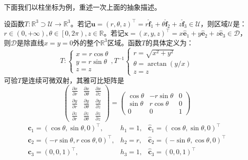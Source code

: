 \documentclass[main.tex]{subfiles}
\begin{document}
下面我们以柱坐标为例，重述一次上面的抽象描述。

\begin{example}[柱坐标]
设函数$T:\mathbb{R}^3\supset\mathcal{U}\rightarrow\mathbb{R}^3$。若记$\mathbf{u}=\left(r,\theta,z\right)^\intercal=r\mathbf{\hat{f}}_1+\theta\mathbf{\hat{f}}_2+z\mathbf{\hat{f}}_3\in\mathcal{U}$，则区域$\mathcal{U}$是：$r\in\left(0,+\infty\right),\theta\in\left[0,2\pi\right),z\in\mathbb{R}$。若记$\mathbf{x}=\left(x,y,z\right)^\intercal=x\mathbf{\hat{e}}_1+y\mathbf{\hat{e}}_2+z\mathbf{\hat{e}}_3\in\mathcal{D}$，则$\mathcal{D}$是除直线$x=y=0$外的整个$\mathbb{R}^3$区域。函数$T$的具体定义为：
\begin{equation*}
T:\left\{\begin{array}{l}
x=r\cos \theta\\
y=r\sin \theta\\
z=z\end{array}\right.,T^{-1}
\left\{\begin{array}{l}
r=\sqrt{x^2+y^2}\\
\theta=\arctan\left(y/x\right)\\
z=z\end{array}\right.
\end{equation*}
可验$T$是连续可微双射，其雅可比矩阵是
\[
\left(\begin{array}{ccc}
\frac{\partial x}{\partial r}&\frac{\partial x}{\partial \theta}&\frac{\partial x}{\partial z}\\
\frac{\partial y}{\partial r}&\frac{\partial y}{\partial \theta}&\frac{\partial y}{\partial z}\\
\frac{\partial z}{\partial r}&\frac{\partial z}{\partial\theta}&\frac{\partial z}{\partial z}
\end{array}\right)=\left(\begin{array}{ccc}
\cos\theta&-r\sin\theta&0\\
\sin\theta&r\cos\theta&0\\
0&0&1\end{array}\right)
\]
\begin{equation*}
\begin{array}{lll}
    \mathbf{c}_1=\left(\cos\theta,\sin\theta,0\right)^\intercal,&h_1=1,&\mathbf{\hat{c}}_1=\left(\cos\theta,\sin\theta,0\right)^\intercal\\
    \mathbf{c}_2=\left(-r\sin\theta,r\cos\theta,0\right)^\intercal,&h_2=r,&\mathbf{\hat{c}}_2=\left(-\sin\theta,\cos\theta,0\right)^\intercal\\
    \mathbf{c}_3=\left(0,0,1\right)^\intercal,&h_3=1,&\mathbf{\hat{c}}_3=\left(0,0,1\right)^\intercal
    

\end{array}
\end{equation*}
\end{example}
\end{document}
